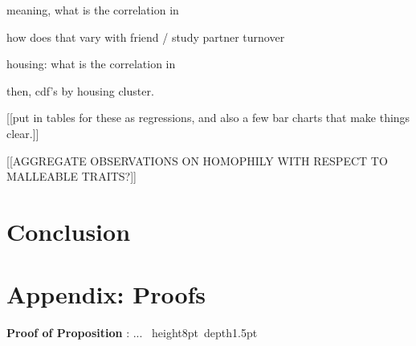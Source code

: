 \documentclass[12pt,letterpaper,english]{article}
\begin{document}
meaning, what is the correlation in %


how does that vary with friend / study partner turnover

housing: what is the correlation in %

then, cdf's by housing cluster.


{\color{red} [[put in tables for these as regressions, and also a few
bar charts that make things clear.]] }

[[AGGREGATE OBSERVATIONS ON HOMOPHILY WITH RESPECT TO MALLEABLE TRAITS?]]


\section{Conclusion}

\newpage
\setcounter{page}{1}
\begin{singlespace}

\end{singlespace}

\newpage
\section*{Appendix: Proofs}

\noindent\textbf{Proof of Proposition }: ... \hbox{\hskip3pt\vrule width4pt
height8pt depth1.5pt}





\end{document}
